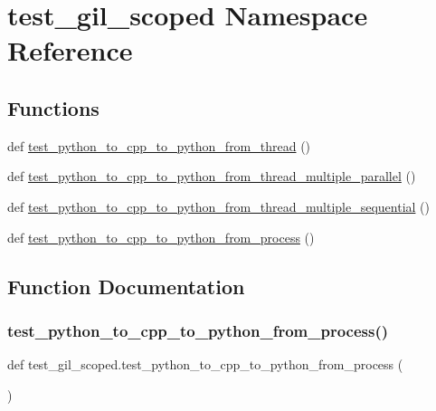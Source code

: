 \hypertarget{namespacetest__gil__scoped}{}\section{test\+\_\+gil\+\_\+scoped Namespace Reference}
\label{namespacetest__gil__scoped}
\subsection*{Functions}
\begin{DoxyCompactItemize}
\item 
def \mbox{\hyperlink{namespacetest__gil__scoped_ac54f4e3b85ef926abdcaef7eb30da388}{test\+\_\+python\+\_\+to\+\_\+cpp\+\_\+to\+\_\+python\+\_\+from\+\_\+thread}} ()
\item 
def \mbox{\hyperlink{namespacetest__gil__scoped_a888e2a5b3e2e85735b366cedcb36b949}{test\+\_\+python\+\_\+to\+\_\+cpp\+\_\+to\+\_\+python\+\_\+from\+\_\+thread\+\_\+multiple\+\_\+parallel}} ()
\item 
def \mbox{\hyperlink{namespacetest__gil__scoped_ada15f4c3cc5f3b87c470073a6e296537}{test\+\_\+python\+\_\+to\+\_\+cpp\+\_\+to\+\_\+python\+\_\+from\+\_\+thread\+\_\+multiple\+\_\+sequential}} ()
\item 
def \mbox{\hyperlink{namespacetest__gil__scoped_ae851cb7feb206233dd0904dea8dfbec9}{test\+\_\+python\+\_\+to\+\_\+cpp\+\_\+to\+\_\+python\+\_\+from\+\_\+process}} ()
\end{DoxyCompactItemize}


\subsection{Function Documentation}
\mbox{\label{namespacetest__gil__scoped_ae851cb7feb206233dd0904dea8dfbec9}} 
\subsubsection{\texorpdfstring{test\_python\_to\_cpp\_to\_python\_from\_process()}{test\_python\_to\_cpp\_to\_python\_from\_process()}}
{\footnotesize\ttfamily def test\+\_\+gil\+\_\+scoped.\+test\+\_\+python\+\_\+to\+\_\+cpp\+\_\+to\+\_\+python\+\_\+from\+\_\+process (\begin{DoxyParamCaption}{ }\end{DoxyParamCaption})}


